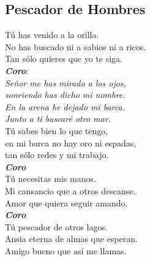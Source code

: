 \subsection{Pescador de Hombres}

\begin{center}
{\Large 
Tú has venido a la orilla.\\
No has buscado ni a sabios ni a ricos.\\
Tan sólo quieres que yo te siga.\\
\vspace{1em}
\textbf{\textit{Coro}}:\\
\textit{Señor me has mirado a los ojos, }\\
\textit{sonriendo has dicho mi nombre.}\\
\textit{En la arena he dejado mi barca.}\\
\textit{Junto a ti buscaré otro mar.}\\
\vspace{1em}
Tú sabes bien lo que tengo,\\
en mi barca no hay oro ni espadas,\\
tan sólo redes y mi trabajo.\\
\vspace{1em}
\textit{\textbf{Coro}}\\
\vspace{1em}
Tú necesitas mis manos.\\
Mi cansancio que a otros descanse.\\
Amor que quiera seguir amando.\\
\vspace{1em}
\textit{\textbf{Coro}}\\
\vspace{1em}
Tú pescador de otros lagos.\\
Ansia eterna de almas que esperan.\\
Amigo bueno que así me llamas.\\

}

\end{center}